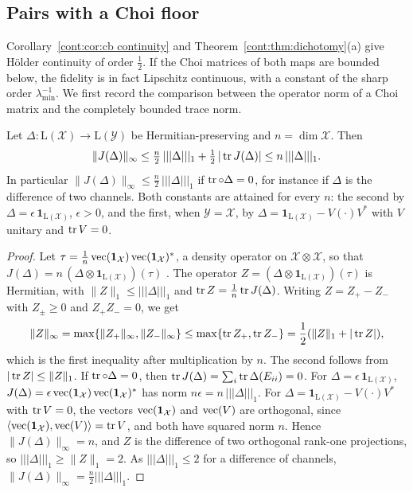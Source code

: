\subsection*{Pairs with a Choi floor} %
Corollary~\ref{cont:cor:cb continuity} and Theorem~\ref{cont:thm:dichotomy}(a) give H\"older continuity of order $\frac12$. If the Choi matrices of both maps are bounded below, the fidelity is in fact Lipschitz continuous, with a constant of the sharp order $\lambda_{\min}^{-1}$. We first record the comparison between the operator norm of a Choi matrix and the completely bounded trace norm.

\begin{lemma}\label{cont:lem:choi vs cb}
Let $\Delta\colon\mathrm{L}(\mathcal{X})\to\mathrm{L}(\mathcal{Y})$ be Hermitian-preserving and $n=\dim\mathcal{X}$. Then
\[
\|J(\Delta)\|_\infty\leq\tfrac n2\,|||\Delta|||_1+\tfrac12\,|\operatorname{tr} J(\Delta)|\leq n\,|||\Delta|||_1 .
\]
In particular $\|J(\Delta)\|_\infty\leq\frac n2\,|||\Delta|||_1$ if $\operatorname{tr}\circ\Delta=0$, for instance if $\Delta$ is the difference of two channels. Both constants are attained for every $n$: the second by $\Delta=\epsilon\,\mathbf{1}_{\mathrm{L}(\mathcal{X})}$, $\epsilon>0$, and the first, when $\mathcal{Y}=\mathcal{X}$, by $\Delta=\mathbf{1}_{\mathrm{L}(\mathcal{X})}-V(\cdot)V^*$ with $V$ unitary and $\operatorname{tr} V=0$.
\end{lemma}

\begin{proof}
Let $\tau=\frac1n\operatorname{vec}(\mathbf{1}_{\mathcal{X}})\operatorname{vec}(\mathbf{1}_{\mathcal{X}})^*$, a density operator on $\mathcal{X}\otimes\mathcal{X}$, so that $J(\Delta)=n\,(\Delta\otimes\mathbf{1}_{\mathrm{L}(\mathcal{X})})(\tau)$ \cite[Section~2.2.2]{watrous2018theory}. The operator $Z=(\Delta\otimes\mathbf{1}_{\mathrm{L}(\mathcal{X})})(\tau)$ is Hermitian, with $\|Z\|_1\leq|||\Delta|||_1$ and $\operatorname{tr} Z=\frac1n\operatorname{tr} J(\Delta)$. Writing $Z=Z_+-Z_-$ with $Z_\pm\geq0$ and $Z_+Z_-=0$, we get
\[
\|Z\|_\infty=\max\{\|Z_+\|_\infty,\|Z_-\|_\infty\}\leq\max\{\operatorname{tr} Z_+,\operatorname{tr} Z_-\}=\frac12(\|Z\|_1+|\operatorname{tr} Z|),
\]
which is the first inequality after multiplication by $n$. The second follows from $|\operatorname{tr} Z|\leq\|Z\|_1$. If $\operatorname{tr}\circ\Delta=0$, then $\operatorname{tr} J(\Delta)=\sum_i\operatorname{tr}\Delta(E_{ii})=0$.
For $\Delta=\epsilon\,\mathbf{1}_{\mathrm{L}(\mathcal{X})}$, $J(\Delta)=\epsilon\operatorname{vec}(\mathbf{1}_{\mathcal{X}})\operatorname{vec}(\mathbf{1}_{\mathcal{X}})^*$ has norm $n\epsilon=n\,|||\Delta|||_1$. For $\Delta=\mathbf{1}_{\mathrm{L}(\mathcal{X})}-V(\cdot)V^*$ with $\operatorname{tr} V=0$, the vectors $\operatorname{vec}(\mathbf{1}_{\mathcal{X}})$ and $\operatorname{vec}(V)$ are orthogonal, since $\langle\operatorname{vec}(\mathbf{1}_{\mathcal{X}}),\operatorname{vec}(V)\rangle=\operatorname{tr} V$, and both have squared norm $n$. Hence $\|J(\Delta)\|_\infty=n$, and $Z$ is the difference of two orthogonal rank-one projections, so $|||\Delta|||_1\geq\|Z\|_1=2$. As $|||\Delta|||_1\leq2$ for a difference of channels, $\|J(\Delta)\|_\infty=\frac n2|||\Delta|||_1$.
\end{proof}

